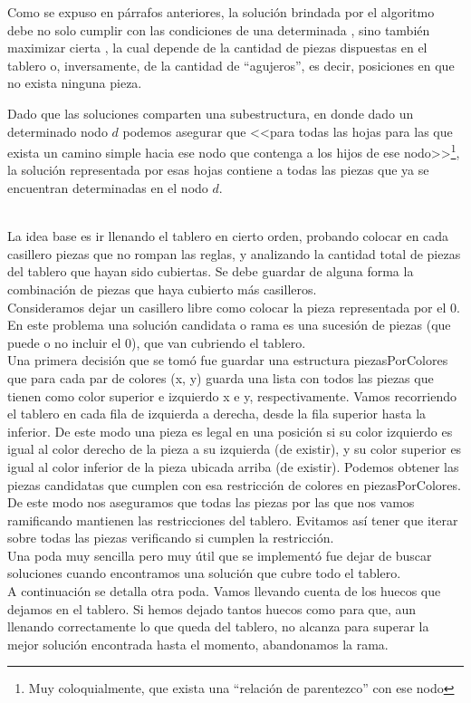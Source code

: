 \documentclass[11pt, a4paper, twoside]{article}
\begin{document}
Como se expuso en párrafos anteriores, la solución brindada por el algoritmo debe no solo cumplir con las condiciones de una determinada , sino también maximizar cierta , la cual depende de la cantidad de piezas dispuestas en el tablero o, inversamente, de la cantidad de ``agujeros'', es decir, posiciones en que no exista ninguna pieza.

Dado que las soluciones comparten una subestructura, en donde dado un determinado nodo $d$ podemos asegurar que <<para todas las hojas para las que exista un camino simple hacia ese nodo que contenga a los hijos de ese nodo>>\footnote{Muy coloquialmente, que exista una ``relación de parentezco'' con ese nodo}, la solución representada por esas hojas contiene a todas las piezas que ya se encuentran determinadas en el nodo $d$.

\\

La idea base es ir llenando el tablero en cierto orden, probando colocar en cada
casillero piezas que no rompan las reglas, y analizando la cantidad total de
piezas del tablero que hayan sido cubiertas. Se debe guardar de alguna forma la
combinación de piezas que haya cubierto más casilleros.\\ Consideramos dejar un
casillero libre como colocar la pieza representada por el 0. En este problema
una solución candidata o rama es una sucesión de piezas (que puede o no incluir
el 0), que van cubriendo el tablero.\\ Una primera decisión que se tomó fue
guardar una estructura piezasPorColores que para cada par de colores (x, y)
guarda una lista con todos las piezas que tienen como color superior e izquierdo
x e y, respectivamente. Vamos recorriendo el tablero en cada fila de izquierda a
derecha, desde la fila superior hasta la inferior. De este modo una pieza es
legal en una posición si su color izquierdo es igual al color derecho de la
pieza a su izquierda (de existir), y su color superior es igual al color
inferior de la pieza ubicada arriba (de existir). Podemos obtener las piezas
candidatas que cumplen con esa restricción de colores en piezasPorColores. De
este modo nos aseguramos que todas las piezas por las que nos vamos ramificando
mantienen las restricciones del tablero. Evitamos así tener que iterar sobre
todas las piezas verificando si cumplen la restricción.\\
Una poda muy sencilla pero muy útil que se 
implementó fue dejar de buscar soluciones cuando encontramos una solución que
cubre todo el tablero. \\
A continuación se detalla otra poda. Vamos
llevando cuenta de los huecos que dejamos en el tablero. Si hemos dejado tantos
huecos como para que, aun llenando correctamente lo que queda del tablero, no
alcanza para superar la mejor solución encontrada hasta el momento, abandonamos
la rama.\\
\end{document}
